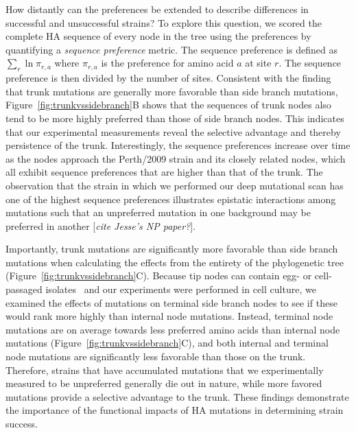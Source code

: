 \documentclass[9pt,twocolumn,twoside]{pnas-new}
\newcommand{\comment}[1]{{\color{red}[\textsl{#1}]}}
\begin{document}
How distantly can the preferences be extended to describe differences in successful and unsuccessful strains?
To explore this question, we scored the complete HA sequence of every node in the tree using the preferences by quantifying a \textit{sequence preference} metric.
The sequence preference is defined as 
$\displaystyle\sum_{r} \ln \pi_{r, a}$
where $\pi_{r, a}$ is the preference for amino acid $a$ at site $r$.
The sequence preference is then divided by the number of sites.
Consistent with the finding that trunk mutations are generally more favorable than side branch mutations, Figure~\ref{fig:trunkvssidebranch}B shows that the sequences of trunk nodes also tend to be more highly preferred than those of side branch nodes.
This indicates that our experimental measurements reveal the selective advantage and thereby persistence of the trunk.
Interestingly, the sequence preferences increase over time as the nodes approach the Perth/2009 strain and its closely related nodes, which all exhibit sequence preferences that are higher than that of the trunk. 
The observation that the strain in which we performed our deep mutational scan has one of the highest sequence preferences illustrates epistatic interactions among mutations such that an unpreferred mutation in one background may be preferred in another \comment{cite Jesse's NP paper?}.

Importantly, trunk mutations are significantly more favorable than side branch mutations when calculating the effects from the entirety of the phylogenetic tree (Figure~\ref{fig:trunkvssidebranch}C).
Because tip nodes can contain egg- or cell-passaged isolates~\citep{wu2017structural,mcwhite2016sequence,skowronski2016mutations} and our experiments were performed in cell culture, we examined the effects of mutations on terminal side branch nodes to see if these would rank more highly than internal node mutations.
Instead, terminal node mutations are on average towards less preferred amino acids than internal node mutations (Figure~\ref{fig:trunkvssidebranch}C), and both internal and terminal node mutations are significantly less favorable than those on the trunk.
Therefore, strains that have accumulated mutations that we experimentally measured to be unpreferred generally die out in nature, while more favored mutations provide a selective advantage to the trunk.
These findings demonstrate the importance of the functional impacts of HA mutations in determining strain success.
\end{document}
